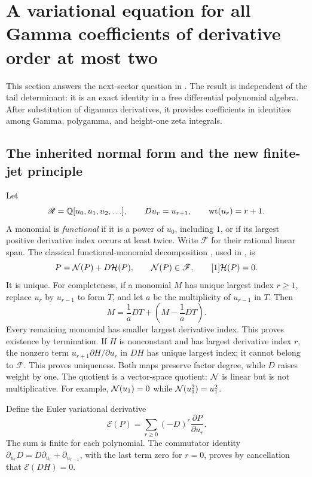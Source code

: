 \section{A variational equation for all Gamma coefficients of derivative order at most two}
\label{var:section}

This section answers the next-sector question in
\cite[research questions 4--5]{PTI}. The result is independent of the
tail determinant: it is an exact identity in a free differential
polynomial algebra. After substitution of digamma derivatives, it
provides coefficients in identities among Gamma, polygamma, and
height-one zeta integrals.

\subsection{The inherited normal form and the new finite-jet principle}

Let
\[
 \mathscr R=\mathbb Q[u_0,u_1,u_2,\ldots],\qquad
 Du_r=u_{r+1},\qquad \operatorname{wt}(u_r)=r+1.
\]
A monomial is \emph{functional} if it is a power of $u_0$, including
$1$, or if its largest positive derivative index occurs at least twice.
Write $\mathscr F$ for their rational linear span.
The classical functional-monomial decomposition
\cite[Proposition 4.10]{Guo2014}, used in \cite{DPL,PTI}, is
\begin{equation}\label{var:normal}
 P=\mathcal N(P)+D\mathcal H(P),\qquad \mathcal N(P)\in\mathscr F,
 \qquad [1]\mathcal H(P)=0.
\end{equation}
It is unique. For completeness, if a monomial $M$ has unique largest
index $r\ge1$, replace $u_r$ by $u_{r-1}$ to form $T$, and let $a$
be the multiplicity of $u_{r-1}$ in $T$. Then
\[
 M=\frac1aDT+\left(M-\frac1aDT\right).
\]
Every remaining monomial has smaller largest derivative index.
This proves existence by termination. If $H$ is nonconstant and has
largest derivative index $r$, the nonzero term
$u_{r+1}\partial H/\partial u_r$ in $DH$ has unique largest index;
it cannot belong to $\mathscr F$. This proves uniqueness. Both maps
preserve factor degree, while $D$ raises weight by one. The quotient
is a vector-space quotient: $\mathcal N$ is linear but is not multiplicative.
For example, $\mathcal N(u_1)=0$ while $\mathcal N(u_1^2)=u_1^2$.

Define the Euler variational derivative
\begin{equation}\label{var:Euler}
 \mathscr E(P)=\sum_{r\ge0}(-D)^r\frac{\partial P}{\partial u_r}.
\end{equation}
The sum is finite for each polynomial. The commutator identity
$\partial_{u_r}D=D\partial_{u_r}+\partial_{u_{r-1}}$, with the
last term zero for $r=0$, proves by cancellation that
$\mathscr E(DH)=0$.

